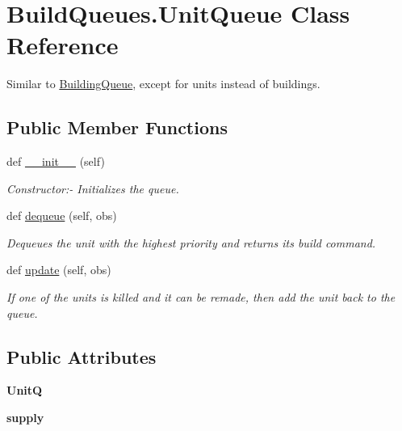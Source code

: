 \hypertarget{classBuildQueues_1_1UnitQueue}{}\section{Build\+Queues.\+Unit\+Queue Class Reference}
\label{classBuildQueues_1_1UnitQueue}


Similar to \hyperlink{classBuildQueues_1_1BuildingQueue}{Building\+Queue}, except for units instead of buildings.  


\subsection*{Public Member Functions}
\begin{DoxyCompactItemize}
\item 
def \hyperlink{classBuildQueues_1_1UnitQueue_ae5a1144fed23da3fe9ca8c1ae0c9718d}{\+\_\+\+\_\+init\+\_\+\+\_\+} (self)
\begin{DoxyCompactList}\small\item\em Constructor\+:-\/ Initializes the queue. \end{DoxyCompactList}\item 
def \hyperlink{classBuildQueues_1_1UnitQueue_aaec23a79990442accceaeca29cf71aa9}{dequeue} (self, obs)
\begin{DoxyCompactList}\small\item\em Dequeues the unit with the highest \textquotesingle{}priority\textquotesingle{} and returns it\textquotesingle{}s build command. \end{DoxyCompactList}\item 
def \hyperlink{classBuildQueues_1_1UnitQueue_a1c049d56542cc875d447d080ffe1156a}{update} (self, obs)
\begin{DoxyCompactList}\small\item\em If one of the units is killed and it can be remade, then add the unit back to the queue. \end{DoxyCompactList}\end{DoxyCompactItemize}
\subsection*{Public Attributes}
\begin{DoxyCompactItemize}
\item 
{\bfseries UnitQ}\hypertarget{classBuildQueues_1_1UnitQueue_a7ab2923b0cf7a4aa672c00987fe16f6c}{}\label{classBuildQueues_1_1UnitQueue_a7ab2923b0cf7a4aa672c00987fe16f6c}

\item 
{\bfseries supply}\hypertarget{classBuildQueues_1_1UnitQueue_a6dc53257037e1337109b09d994ef25cc}{}\label{classBuildQueues_1_1UnitQueue_a6dc53257037e1337109b09d994ef25cc}

\end{DoxyCompactItemize}


